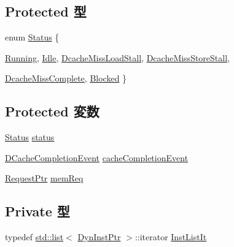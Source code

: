 \subsection*{Protected 型}
\begin{DoxyCompactItemize}
\item 
enum \hyperlink{classInorderBackEnd_a67a0db04d321a74b7e7fcfd3f1a3f70b}{Status} \{ \par
\hyperlink{classInorderBackEnd_a67a0db04d321a74b7e7fcfd3f1a3f70ba2f5f2c4a8c4f4f0519d503dcdfbf55cb}{Running}, 
\hyperlink{classInorderBackEnd_a67a0db04d321a74b7e7fcfd3f1a3f70bad3fa9ae9431d6cb1772f9d9df48cab19}{Idle}, 
\hyperlink{classInorderBackEnd_a67a0db04d321a74b7e7fcfd3f1a3f70bad5ccc7221ed484b5a546171f5a52c806}{DcacheMissLoadStall}, 
\hyperlink{classInorderBackEnd_a67a0db04d321a74b7e7fcfd3f1a3f70ba616b5057fea90109e3c27b633a60b77f}{DcacheMissStoreStall}, 
\par
\hyperlink{classInorderBackEnd_a67a0db04d321a74b7e7fcfd3f1a3f70ba1eb81f4540c1c4b90839b08ae63c5d7f}{DcacheMissComplete}, 
\hyperlink{classInorderBackEnd_a67a0db04d321a74b7e7fcfd3f1a3f70ba9463ee9b8700258a1019b4b9d2d77a30}{Blocked}
 \}
\end{DoxyCompactItemize}
\subsection*{Protected 変数}
\begin{DoxyCompactItemize}
\item 
\hyperlink{classInorderBackEnd_a67a0db04d321a74b7e7fcfd3f1a3f70b}{Status} \hyperlink{classInorderBackEnd_ae29aa2d4ae440022daaed1107eb306b3}{status}
\item 
\hyperlink{classInorderBackEnd_1_1DCacheCompletionEvent}{DCacheCompletionEvent} \hyperlink{classInorderBackEnd_a08f9ddeb55a0840fc2f9d8f4c5e7a9fc}{cacheCompletionEvent}
\item 
\hyperlink{classRequest}{RequestPtr} \hyperlink{classInorderBackEnd_a5520eb2f7c2cf4b0e109d6ffd6d2d053}{memReq}
\end{DoxyCompactItemize}
\subsection*{Private 型}
\begin{DoxyCompactItemize}
\item 
typedef \hyperlink{classstd_1_1list}{std::list}$<$ \hyperlink{classInorderBackEnd_a028ce10889c5f6450239d9e9a7347976}{DynInstPtr} $>$::iterator \hyperlink{classInorderBackEnd_a4da46d72d68fcd5bfe65dc701c358379}{InstListIt}
\end{DoxyCompactItemize}
